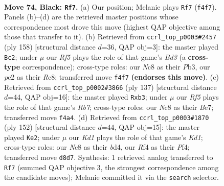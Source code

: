 \documentclass[11pt]{article}
\begin{document}
\clearpage

\begin{figure}[p]\centering
\begin{subfigure}{0.46\textwidth}\centering
\resizebox{\linewidth}{!}{%
\newchessgame
\chessboard[
  setfen={1Rnk4/8/P7/2P4p/5r2/2pB3P/2P1K1P1/8 b - - 1 74},
  showmover=false,
  pgfstyle=straightmove, color=movearrow, markmove={f4-f7}
]}
\caption{}
\end{subfigure}\hfill
\begin{subfigure}{0.46\textwidth}\centering
\resizebox{\linewidth}{!}{%
\newchessgame
\chessboard[
  setfen={2R5/1r6/3pPb2/3P2k1/1p6/1PpBK3/8/8 w - - 30 80},
  showmover=false,
  pgfstyle=straightmove, color=movearrow, markmove={d3-c2}
]}
\caption{}
\end{subfigure}
\\[4pt]
\begin{subfigure}{0.46\textwidth}\centering
\resizebox{\linewidth}{!}{%
\newchessgame
\chessboard[
  setfen={8/1R2bk2/8/1P3p2/3PpP1p/1P2P3/1r6/6BK b - - 0 69},
  showmover=false,
  pgfstyle=straightmove, color=movearrow, markmove={b2-b3}
]}
\caption{}
\end{subfigure}\hfill
\begin{subfigure}{0.46\textwidth}\centering
\resizebox{\linewidth}{!}{%
\newchessgame
\chessboard[
  setfen={8/6p1/7p/2p2p1P/R2bkP2/6P1/8/3K4 w - - 3 77},
  showmover=false,
  pgfstyle=straightmove, color=movearrow, markmove={d1-e2}
]}
\caption{}
\end{subfigure}
\caption{\textbf{Move 74, Black: \texttt{Rf7}.} (a) Our position; Melanie plays \texttt{Rf7} (\texttt{f4f7}). Panels (b)--(d) are the retrieved master positions whose correspondence most drove this move (highest QAP objective among those that transfer to it). (b) Retrieved from \texttt{ccrl\_top\_p0003\#2457} (ply 158) [structural distance $d$=36, QAP obj=3]: the master played \texttt{Bc2}; under $\mu$ our \emph{Rf5} plays the role of that game's \emph{Bd3} (a \textbf{cross-type} correspondence); cross-type roles: our \emph{N}c8 as their \emph{P}b3, our \emph{p}c2 as their \emph{R}c8; transferred move \texttt{f4f7} \textbf{(endorses this move)}. (c) Retrieved from \texttt{ccrl\_top\_p0002\#3866} (ply 137) [structural distance $d$=44, QAP obj=16]: the master played \texttt{Rxb3}; under $\mu$ our \emph{Rf5} plays the role of that game's \emph{Rb7}; cross-type roles: our \emph{N}c8 as their \emph{B}e7; transferred move \texttt{f4a4}. (d) Retrieved from \texttt{ccrl\_top\_p0003\#1870} (ply 152) [structural distance $d$=44, QAP obj=15]: the master played \texttt{Ke2}; under $\mu$ our \emph{Kd1} plays the role of that game's \emph{Kd1}; cross-type roles: our \emph{N}c8 as their \emph{b}d4, our \emph{R}f4 as their \emph{P}f4; transferred move \texttt{d8d7}. Synthesis: 1 retrieved analog transferred to \texttt{Rf7} (summed QAP objective 3, the strongest correspondence among the candidate moves); Melanie committed it via the \texttt{search} selector.}
\label{fig:thought-m147}
\end{figure}
\end{document}
